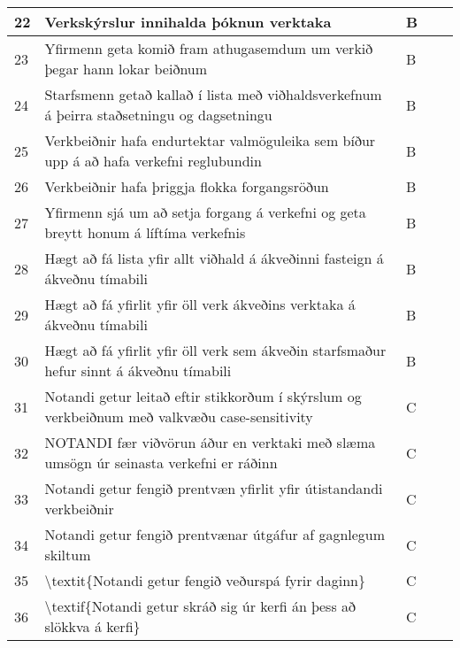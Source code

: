 \documentclass[a4paper]{article}
\begin{document}
\begin{tabular}{|l|l|l|l|l|}
\hline
22& Verkskýrslur innihalda þóknun verktaka & B & &\\
\hline
23& Yfirmenn geta komið fram athugasemdum um verkið þegar hann lokar beiðnum & B & &\\
\hline
24& Starfsmenn getað kallað í lista með viðhaldsverkefnum á þeirra staðsetningu og dagsetningu & B & &\\
\hline
25& Verkbeiðnir hafa endurtektar valmöguleika sem bíður upp á að hafa verkefni reglubundin & B & &\\
\hline
26& Verkbeiðnir hafa þriggja flokka forgangsröðun & B & &\\
\hline
27& Yfirmenn sjá um að setja forgang á verkefni og geta breytt honum á líftíma verkefnis  & B & &\\
\hline
28& Hægt að fá lista yfir allt viðhald á ákveðinni fasteign á ákveðnu tímabili  & B & &\\
\hline
29& Hægt að fá yfirlit yfir öll verk ákveðins verktaka á ákveðnu tímabili  & B & &\\
\hline
30& Hægt að fá yfirlit yfir öll verk sem ákveðin starfsmaður hefur sinnt á ákveðnu tímabili  & B & &\\
\hline
31& Notandi getur leitað eftir stikkorðum í skýrslum og verkbeiðnum með valkvæðu case-sensitivity& C & &\\
\hline
32& NOTANDI fær viðvörun áður en verktaki með slæma umsögn úr seinasta verkefni er ráðinn & C & &\\
\hline
33& Notandi getur fengið prentvæn yfirlit yfir útistandandi verkbeiðnir & C & &\\
\hline
34& Notandi getur fengið prentvænar útgáfur af gagnlegum skiltum & C & &\\
\hline
35& \textbackslash{}textit\{Notandi getur fengið veðurspá fyrir daginn\} &C &  &\\
\hline
36& \textbackslash{}textif\{Notandi getur skráð sig úr kerfi án þess að slökkva á kerfi\} & C &&\\
\hline
\end{tabular}
\end{document}
